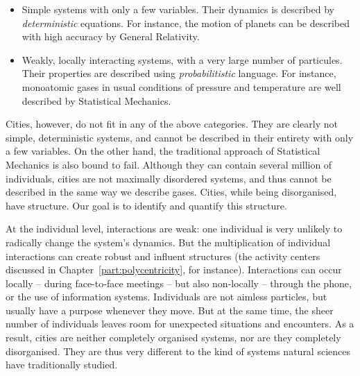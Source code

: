 \begin{itemize}
    \item Simple systems with only a few variables. Their dynamics is described
        by \emph{deterministic} equations. For instance, the motion of planets
        can be described with high accuracy by General Relativity.
    \item Weakly, locally interacting systems, with a very large number of
        particules. Their properties are described using \emph{probabilitistic}
        language. For instance, monoatomic gases in usual conditions of pressure
        and temperature are well described by Statistical Mechanics.
\end{itemize}

Cities, however, do not fit in any of the above categories. They are clearly not
simple, deterministic systems, and cannot be described in their entirety with
only a few variables. On the other hand, the traditional approach of Statistical
Mechanics is also bound to fail. Although they can contain several million of
individuals, cities are not maximally disordered systems, and thus cannot be
described in the same way we describe gases. Cities, while being disorganised,
have structure. Our goal is to identify and quantify this structure.

At the individual level, interactions are weak: one individual is very unlikely
to radically change the system's dynamics. But the multiplication of individual
interactions can create robust and influent structures (the activity centers
discussed in Chapter~\ref{part:polycentricity}, for instance). Interactions can
occur locally -- during face-to-face meetings -- but also non-locally
 -- through the phone, or the use of information systems. 
Individuals are not aimless particles, but usually have a purpose whenever they
move. But at the same time, the sheer number of individuals leaves room for unexpected situations
and encounters. As a result, cities are neither completely organised systems,
nor are they completely disorganised. They are thus very different to the
kind of systems natural sciences have traditionally studied. 





